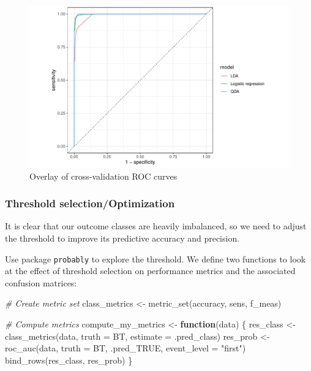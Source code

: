 \documentclass[
]{article}
\newenvironment{Shaded}{\begin{snugshade}}{\end{snugshade}}
\newcommand{\AttributeTok}[1]{\textcolor[rgb]{0.77,0.63,0.00}{#1}}
\newcommand{\CommentTok}[1]{\textcolor[rgb]{0.56,0.35,0.01}{\textit{#1}}}
\newcommand{\ControlFlowTok}[1]{\textcolor[rgb]{0.13,0.29,0.53}{\textbf{#1}}}
\newcommand{\FunctionTok}[1]{\textcolor[rgb]{0.00,0.00,0.00}{#1}}
\newcommand{\NormalTok}[1]{#1}
\newcommand{\OtherTok}[1]{\textcolor[rgb]{0.56,0.35,0.01}{#1}}
\newcommand{\StringTok}[1]{\textcolor[rgb]{0.31,0.60,0.02}{#1}}
\begin{document}
\begin{figure}[H]

{\centering \includegraphics{ProjectPart1_MERGED_files/figure-latex/cv-roc-curves-overlay-1} 

}

\caption{Overlay of cross-validation ROC curves}\label{fig:cv-roc-curves-overlay}
\end{figure}

\hypertarget{threshold-selectionoptimization}{%
\subsubsection{Threshold
selection/Optimization}\label{threshold-selectionoptimization}}

It is clear that our outcome classes are heavily imbalanced, so we need
to adjust the threshold to improve its predictive accuracy and
precision.

Use package \texttt{probably} to explore the threshold. We define two
functions to look at the effect of threshold selection on performance
metrics and the associated confusion matrices:

\begin{Shaded}
\begin{Highlighting}[]
\CommentTok{\# Create metric set}
\NormalTok{class\_metrics }\OtherTok{\textless{}{-}} \FunctionTok{metric\_set}\NormalTok{(accuracy, sens, f\_meas)}

\CommentTok{\# Compute metrics}
\NormalTok{compute\_my\_metrics }\OtherTok{\textless{}{-}} \ControlFlowTok{function}\NormalTok{(data) \{}
\NormalTok{  res\_class }\OtherTok{\textless{}{-}} \FunctionTok{class\_metrics}\NormalTok{(data, }\AttributeTok{truth =}\NormalTok{ BT, }\AttributeTok{estimate =}\NormalTok{ .pred\_class)}
\NormalTok{  res\_prob  }\OtherTok{\textless{}{-}} \FunctionTok{roc\_auc}\NormalTok{(data, }\AttributeTok{truth =}\NormalTok{ BT, .pred\_TRUE, }\AttributeTok{event\_level =} \StringTok{"first"}\NormalTok{)}
  \FunctionTok{bind\_rows}\NormalTok{(res\_class, res\_prob)}
\NormalTok{\}}
\end{Highlighting}
\end{Shaded}
\end{document}
